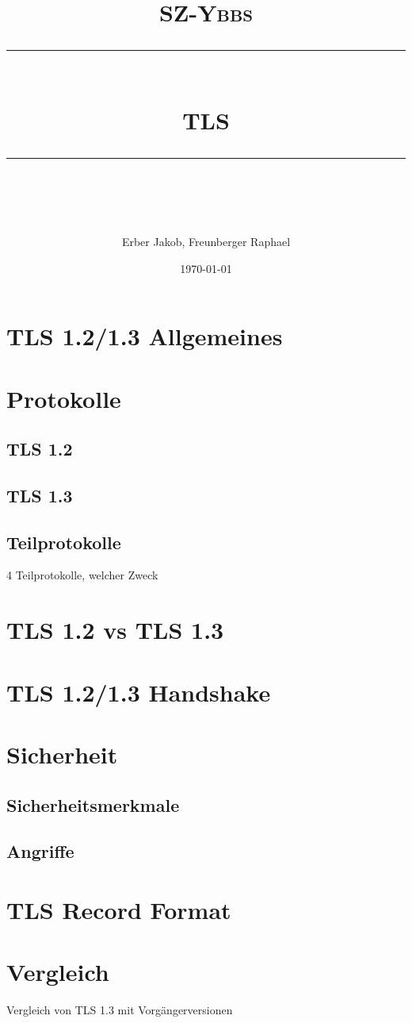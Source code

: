 \documentclass[11pt]{scrartcl} %
\title{	
	\normalfont\normalsize
	\textsc{SZ-Ybbs}\\ %
	\vspace{25pt} %
	\rule{\linewidth}{0.5pt}\\ %
	\vspace{20pt} %
	{\huge TLS}\\ %
	\vspace{12pt} %
	\rule{\linewidth}{2pt}\\ %
	\vspace{12pt} %
}
\author{\LARGE Erber Jakob, Freunberger Raphael} %
\date{\normalsize\today} %
\begin{document}
\maketitle %

\section{TLS 1.2/1.3 Allgemeines}

\section{Protokolle}

\subsection{TLS 1.2}

\subsection{TLS 1.3}

\subsection{Teilprotokolle}
4 Teilprotokolle, welcher Zweck

\section{TLS 1.2 vs TLS 1.3}

\section{TLS 1.2/1.3 Handshake}

\section{Sicherheit}
\subsection{Sicherheitsmerkmale}
\subsection{Angriffe}

\section{TLS Record Format}

\section{Vergleich}
Vergleich von TLS 1.3 mit Vorgängerversionen
\end{document}
